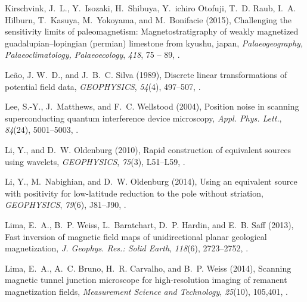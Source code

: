\documentclass[galley,gc]{agutex}
\begin{document}
\begin{article}
\begin{thebibliography}{42}
Kirschvink, J.~L., Y.~Isozaki, H.~Shibuya, Y.~ichiro Otofuji, T.~D. Raub, I.~A.
  Hilburn, T.~Kasuya, M.~Yokoyama, and M.~Bonifacie (2015), Challenging the
  sensitivity limits of paleomagnetism: Magnetostratigraphy of weakly
  magnetized guadalupian–lopingian (permian) limestone from kyushu, japan,
  \textit{Palaeogeography, Palaeoclimatology, Palaeoecology}, \textit{418}, 75
  -- 89, .

Le\~{a}o, J. W.~D., and J.~B.~C. Silva (1989), Discrete linear transformations
  of potential field data, \textit{GEOPHYSICS}, \textit{54}(4), 497--507,
  .

Lee, S.-Y., J.~Matthews, and F.~C. Wellstood (2004), Position noise in scanning
  superconducting quantum interference device microscopy, \textit{Appl. Phys.
  Lett.}, \textit{84}(24), 5001--5003, .

Li, Y., and D.~W. Oldenburg (2010), Rapid construction of equivalent sources
  using wavelets, \textit{GEOPHYSICS}, \textit{75}(3), L51--L59,
  .

Li, Y., M.~Nabighian, and D.~W. Oldenburg (2014), Using an equivalent source
  with positivity for low-latitude reduction to the pole without striation,
  \textit{GEOPHYSICS}, \textit{79}(6), J81--J90, .

Lima, E.~A., B.~P. Weiss, L.~Baratchart, D.~P. Hardin, and E.~B. Saff (2013),
  Fast inversion of magnetic field maps of unidirectional planar geological
  magnetization, \textit{J. Geophys. Res.: Solid Earth}, \textit{118}(6),
  2723--2752, .

Lima, E.~A., A.~C. Bruno, H.~R. Carvalho, and B.~P. Weiss (2014), Scanning
  magnetic tunnel junction microscope for high-resolution imaging of remanent
  magnetization fields, \textit{Measurement Science and Technology},
  \textit{25}(10), 105,401, .


\end{thebibliography}
\end{article}
\end{document}
